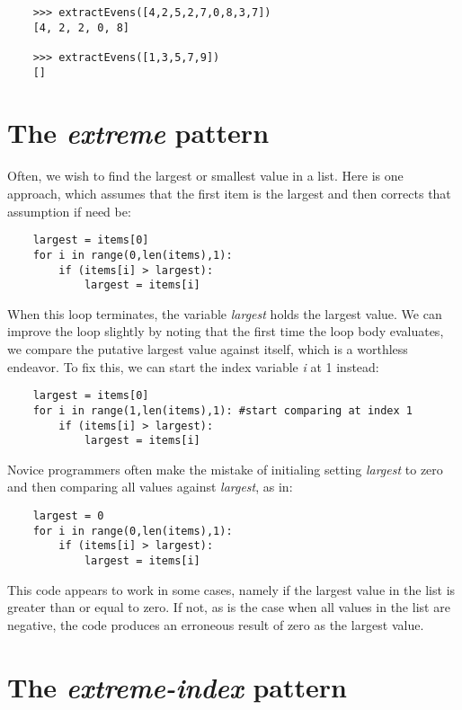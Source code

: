 \begin{verbatim}
    >>> extractEvens([4,2,5,2,7,0,8,3,7])
    [4, 2, 2, 0, 8]

    >>> extractEvens([1,3,5,7,9])
    []
\end{verbatim}

\section{The {\it extreme} pattern}

Often, we wish to find the largest or smallest value
in a list. Here is one approach, which assumes that the
first item is the largest and then corrects that assumption
if need be:

\begin{verbatim}
    largest = items[0]
    for i in range(0,len(items),1):
        if (items[i] > largest):
            largest = items[i]
\end{verbatim}

When this loop terminates, the variable {\it largest} holds the
largest value. We can improve the loop slightly by noting
that the first time the loop body evaluates, we compare the
putative largest value against itself, which is a worthless
endeavor. To fix this, we can start the index variable {\it i}
at 1 instead:

\begin{verbatim}
    largest = items[0]
    for i in range(1,len(items),1): #start comparing at index 1
        if (items[i] > largest):
            largest = items[i]
\end{verbatim}

Novice programmers often make the mistake of initialing setting
{\it largest} to zero and then comparing all values against {\it largest},
as in:

\begin{verbatim}
    largest = 0
    for i in range(0,len(items),1):
        if (items[i] > largest):
            largest = items[i]
\end{verbatim}

This code appears to work in some cases, namely if the largest
value in the list is greater than or equal to zero. If not,
as is the case when all values in the list are negative,
the code produces an erroneous result of zero as the largest
value.

\section{The {\it extreme-index} pattern}

